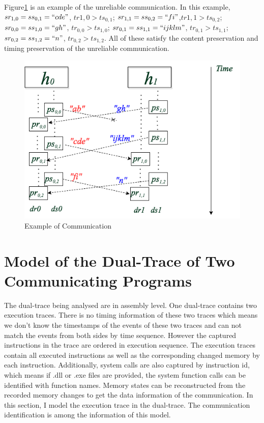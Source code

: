 Figure\ref{unreliableexample} is an example of the unreliable communication. In this example, $sr_{1,0} = ss_{0,1}=``cde"$, $tr{1,0} > ts_{0,1}$; $sr_{1,1} = ss_{0,2}=``fi"$,$tr{1,1} > ts_{0,2}$; $sr_{0,0} = ss_{1,0}=``gh"$, $tr_{0,0} > ts_{1,0}$; $sr_{0,1} = ss_{1,1}=``ijklm"$,  $tr_{0,1} > ts_{1,1}$; $sr_{0,2} = ss_{1,2}=``n"$,  $tr_{0,2} > ts_{1,2}$. All of these satisfy the content preservation and timing preservation of the unreliable communication.
\begin{figure}[H]
\centerline{\includegraphics[scale=0.55]{Figures/unreliableexample}}
\caption{Example of Communication}
\label{unreliableexample}
\end{figure}

\section{Model of the Dual-Trace of Two Communicating Programs}
The dual-trace being analysed are in assembly level. One dual-trace contains two execution traces. There is no timing information of these two traces which means we don't know the timestamps of the events of these two traces and can not match the events from both sides by time sequence. However the captured instructions in the trace are ordered in execution sequence. The execution traces contain all executed instructions as well as the corresponding changed memory by each instruction. Additionally, system calls are also captured by instruction id, which means if .dll or .exe files are provided, the system function calls can be identified with function names. Memory states can be reconstructed from the recorded memory changes to get the data information of the communication. In this section, I model the execution trace in the dual-trace. The communication identification is among the information of this model.


